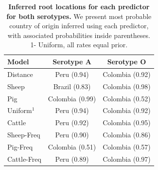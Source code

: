 \documentclass[10pt]{article}
\begin{document}
\begin{table}[!ht]
\caption{
\textbf{Inferred root locations for each predictor for both serotypes.} We present most probable country of origin inferred using each predictor, with associated probabilities inside parentheses. 1- Uniform, all rates equal prior.
}
\begin{tabular}{lcc}
\toprule
Model & Serotype A & Serotype O \\
\midrule
Distance & Peru (0.94) & Colombia (0.92)\\
Sheep    & Brazil (0.83) &Colombia (0.98)\\
Pig      & Colombia (0.99) &Colombia (0.52)\\
Uniform$^1$  & Peru (0.94) &Colombia (0.92)\\
Cattle   & Peru (0.92) &Colombia (0.95)\\
Sheep-Freq & Peru (0.90)&Colombia (0.86)\\
Pig-Freq & Colombia (0.51) &Colombia (0.57)\\
Cattle-Freq & Peru (0.89)& Colombia (0.97)\\
 \bottomrule
\end{tabular}
\begin{flushleft}
\end{flushleft}
\label{tab:roots}
 \end{table}
\end{document}
